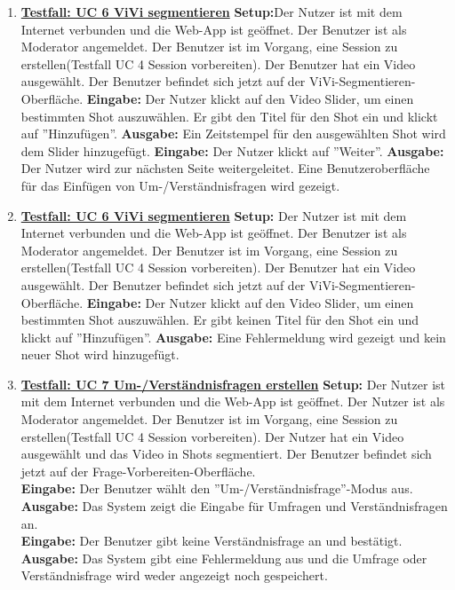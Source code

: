 \begin{enumerate}
	\item \underline{\textbf{Testfall: UC 6 ViVi segmentieren}} \linebreak
	\textbf{Setup:}Der Nutzer ist mit dem Internet verbunden und die Web-App ist geöffnet. Der Benutzer ist als Moderator angemeldet. Der Benutzer ist im Vorgang, eine Session zu erstellen(Testfall UC 4 Session vorbereiten). Der Benutzer hat ein Video ausgewählt. Der Benutzer befindet sich jetzt auf der ViVi-Segmentieren-Oberfläche.\linebreak
	\textbf{Eingabe:} Der Nutzer klickt auf den Video Slider, um einen bestimmten Shot auszuwählen. Er gibt den Titel für den Shot ein und klickt auf ''Hinzufügen''. \linebreak
	\textbf{Ausgabe:} Ein Zeitstempel für den ausgewählten Shot wird dem Slider hinzugefügt.\linebreak
	\textbf{Eingabe:} Der Nutzer klickt auf ''Weiter''. \linebreak
	\textbf{Ausgabe:} Der Nutzer wird zur nächsten Seite weitergeleitet. Eine Benutzeroberfläche für das Einfügen von Um-/Verständnisfragen wird gezeigt.
	
	\item \underline{\textbf{Testfall: UC 6 ViVi segmentieren}} \linebreak
	\textbf{Setup:} Der Nutzer ist mit dem Internet verbunden und die Web-App ist geöffnet. Der Benutzer ist als Moderator angemeldet. Der Benutzer ist im Vorgang, eine Session zu erstellen(Testfall UC 4 Session vorbereiten). Der Benutzer hat ein Video ausgewählt. Der Benutzer befindet sich jetzt auf der ViVi-Segmentieren-Oberfläche.\linebreak
	\textbf{Eingabe:} Der Nutzer klickt auf den Video Slider, um einen bestimmten Shot auszuwählen. Er gibt keinen Titel für den Shot ein und klickt auf ''Hinzufügen''. \linebreak
	\textbf{Ausgabe:} Eine Fehlermeldung wird gezeigt und kein neuer Shot wird hinzugefügt. \linebreak \linebreak
	
	\item \underline{\textbf{Testfall: UC 7 Um-/Verständnisfragen erstellen}} \linebreak
	\textbf{Setup:} Der Nutzer ist mit dem Internet verbunden und die Web-App ist geöffnet. Der Nutzer ist als Moderator angemeldet. Der Benutzer ist im Vorgang, eine Session zu erstellen(Testfall UC 4 Session vorbereiten). Der Nutzer hat ein Video ausgewählt und das Video in Shots segmentiert. Der Benutzer befindet sich jetzt auf der Frage-Vorbereiten-Oberfläche.\\
	\textbf{Eingabe:} Der Benutzer wählt den ''Um-/Verständnisfrage''-Modus aus. \\
	\textbf{Ausgabe:} Das System zeigt die Eingabe für Umfragen und Verständnisfragen an.\\ 
	\textbf{Eingabe:} Der Benutzer gibt keine Verständnisfrage an und bestätigt.\\
	\textbf{Ausgabe:} Das System gibt eine Fehlermeldung aus und die Umfrage oder Verständnisfrage wird weder angezeigt noch gespeichert.


\end{enumerate}
